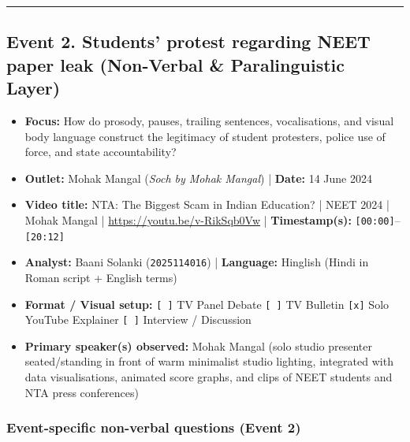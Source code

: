 \documentclass[10pt,a4paper]{article}
\begin{document}
\bigskip\hrule\bigskip

\subsection*{Event 2. Students' protest regarding NEET paper leak (Non-Verbal \& Paralinguistic Layer)}

\begin{itemize}
  \item \textbf{Focus:} How do prosody, pauses, trailing sentences, vocalisations, and visual body language construct the legitimacy of student protesters, police use of force, and state accountability?
  \item \textbf{Outlet:} Mohak Mangal (\textit{Soch by Mohak Mangal}) | \textbf{Date:} 14 June 2024
  \item \textbf{Video title:} NTA: The Biggest Scam in Indian Education? | NEET 2024 | Mohak Mangal | \href{https://youtu.be/v-RikSqb0Vw}{https://youtu.be/v-RikSqb0Vw} | \textbf{Timestamp(s):} \texttt{[00:00]}--\texttt{[20:12]}
  \item \textbf{Analyst:} Baani Solanki (\texttt{2025114016}) | \textbf{Language:} Hinglish (Hindi in Roman script + English terms)
  \item \textbf{Format / Visual setup:} \texttt{[ ]} TV Panel Debate \texttt{[ ]} TV Bulletin \texttt{[x]} Solo YouTube Explainer \texttt{[ ]} Interview / Discussion
  \item \textbf{Primary speaker(s) observed:} Mohak Mangal (solo studio presenter seated/standing in front of warm minimalist studio lighting, integrated with data visualisations, animated score graphs, and clips of NEET students and NTA press conferences)
\end{itemize}

\subsubsection*{Event-specific non-verbal questions (Event 2)}
\end{document}
